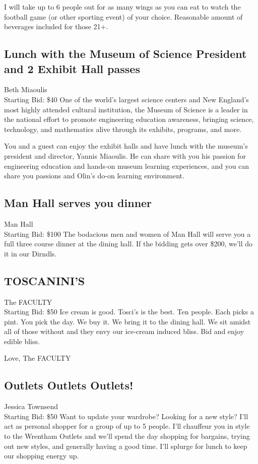 \documentclass[11pt]{article}
\begin{document}
I will take up to 6 people out for as many wings as you can eat to watch the football game (or other sporting event) of your choice. Reasonable amount of beverages included for those 21+.
\subsection{Lunch with the Museum of Science President and 2 Exhibit Hall passes}
Beth Miaoulis
\\
Starting Bid: \$40
\newline
One of the world's largest science centers and New England's most highly attended cultural institution, the Museum of Science is a leader in the national effort to promote engineering education awareness, bringing science, technology, and mathematics alive through its exhibits, programs, and more.

You and a guest can enjoy the exhibit halls and have lunch with the museum's president and director, Yannis Miaoulis. He can share with you his passion for engineering education and hands-on museum learning experiences, and you can share you passions and Olin's do-on learning environment.
\subsection{Man Hall serves you dinner}
Man Hall
\\
Starting Bid: \$100
\newline
The bodacious men and women of Man Hall will serve you a full three course dinner at the dining hall. If the bidding gets over \$200, we'll do it in our Dirndls.
\subsection{TOSCANINI'S}
The FACULTY
\\
Starting Bid: \$50
\newline
Ice cream is good. Tosci's is the best. Ten people. Each picks a pint. You pick the day. We buy it. We bring it to the dining hall. We sit amidst all of those without and they envy our ice-cream induced bliss. Bid and enjoy edible bliss.

Love,
The FACULTY
\subsection{Outlets Outlets Outlets!}
Jessica Townsend
\\
Starting Bid: \$50
\newline
Want to update your wardrobe? Looking for a new style? I'll act as personal shopper for a group of up to 5 people. I'll chauffeur you in style to the Wrentham Outlets and we'll spend the day shopping for bargains, trying out new styles, and generally having a good time. I'll splurge for lunch to keep our shopping energy up.
\end{document}
